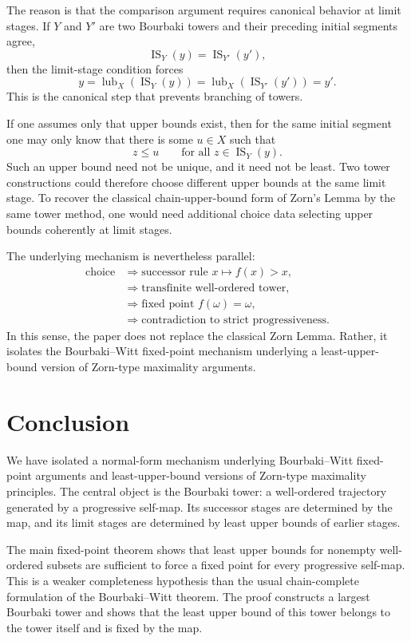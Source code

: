 \documentclass[11pt]{article}
\theoremstyle{definition}
\theoremstyle{remark}
\newcommand{\IS}{\operatorname{IS}}
\newcommand{\lub}{\operatorname{lub}}
\begin{document}
The reason is that the comparison argument requires canonical behavior at limit stages.
If \(Y\) and \(Y'\) are two Bourbaki towers and their preceding initial segments agree,
\[
\IS_Y(y)=\IS_{Y'}(y'),
\]
then the limit-stage condition forces
\[
y=\lub_X(\IS_Y(y))
 =\lub_X(\IS_{Y'}(y'))
 =y'.
\]
This is the canonical step that prevents branching of towers.

If one assumes only that upper bounds exist, then for the same initial segment one may
only know that there is some \(u\in X\) such that
\[
z\leq u
\qquad\text{for all }z\in \IS_Y(y).
\]
Such an upper bound need not be unique, and it need not be least. Two tower constructions
could therefore choose different upper bounds at the same limit stage. To recover the
classical chain-upper-bound form of Zorn's Lemma by the same tower method, one would
need additional choice data selecting upper bounds coherently at limit stages.

The underlying mechanism is nevertheless parallel:
\[
\begin{aligned}
\text{choice}
&\Longrightarrow
\text{successor rule }x\mapsto f(x)>x,\\
&\Longrightarrow
\text{transfinite well-ordered tower},\\
&\Longrightarrow
\text{fixed point }f(\omega)=\omega,\\
&\Longrightarrow
\text{contradiction to strict progressiveness}.
\end{aligned}
\]
In this sense, the paper does not replace the classical Zorn Lemma. Rather, it isolates
the Bourbaki--Witt fixed-point mechanism underlying a least-upper-bound version of
Zorn-type maximality arguments.


\section{Conclusion}

We have isolated a normal-form mechanism underlying Bourbaki--Witt fixed-point arguments
and least-upper-bound versions of Zorn-type maximality principles. The central object is
the Bourbaki tower: a well-ordered trajectory generated by a progressive self-map. Its
successor stages are determined by the map, and its limit stages are determined by least
upper bounds of earlier stages.

The main fixed-point theorem shows that least upper bounds for nonempty well-ordered
subsets are sufficient to force a fixed point for every progressive self-map. This is a
weaker completeness hypothesis than the usual chain-complete formulation of the
Bourbaki--Witt theorem. The proof constructs a largest Bourbaki tower and shows that the
least upper bound of this tower belongs to the tower itself and is fixed by the map.
\end{document}
